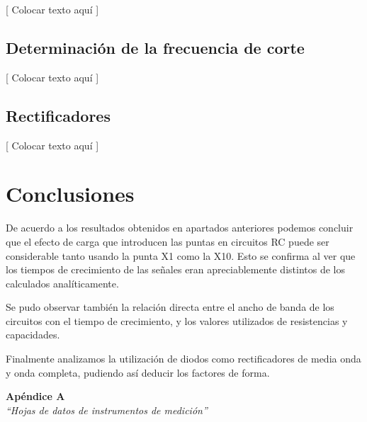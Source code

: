 \documentclass{article}
\begin{document}
	[ Colocar texto aquí ]
	\bigskip



\subsection{Determinación de la frecuencia de corte}
	
	[ Colocar texto aquí ]
	\bigskip



\subsection{Rectificadores}
	
	[ Colocar texto aquí ]
	\bigskip




\section{Conclusiones}

	De acuerdo a los resultados obtenidos en apartados anteriores podemos concluir que el efecto de carga que introducen las puntas en circuitos RC puede ser considerable tanto usando la punta X1 como la X10. Esto se confirma al ver que los tiempos de crecimiento de las señales eran apreciablemente distintos de los calculados analíticamente. 
	\par
	Se pudo observar también la relación directa entre el ancho de banda de los circuitos con el tiempo de crecimiento, y los valores utilizados de resistencias y capacidades. 
	\par
	Finalmente analizamos la utilización de diodos como rectificadores de media onda y onda completa, pudiendo así deducir los factores de forma.
\bigskip\bigskip


\newpage \textit{}
\newpage



\newpage
\vspace*{4cm}
\begin{center}
	\textbf{\Huge{Apéndice A}} \\
	\bigskip\bigskip
	\Large{\textit{``Hojas de datos de instrumentos de medición''}}
\end{center}


\newpage \textit{}
\newpage
\end{document}
